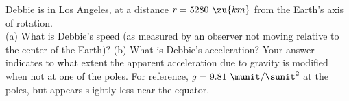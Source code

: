 Debbie is in Los Angeles, at a distance $r = 5280\ \zu{km}$ from the
Earth's axis of rotation.\\
%
(a) What is Debbie's speed (as measured by an observer not
moving relative to the center of the Earth)?\hwendpart
%
(b) What is Debbie's acceleration? Your answer
indicates to what extent the apparent acceleration due to gravity is
modified when not at one of the poles. For reference, 
$g = 9.81\ \munit / \sunit^2$ at the poles, but appears slightly less near the
equator.
